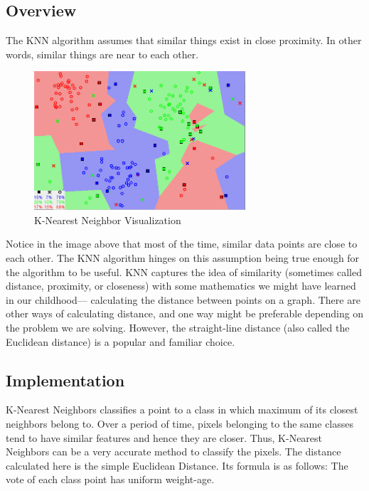 \documentclass[12pt, a4paper]{report}
\begin{document}
\subsection{Overview}
The KNN algorithm assumes that similar things exist in close proximity. In other words, similar things are near to each other.
\begin{figure}[h]
\centering
\includegraphics[width=0.7\textwidth]{knnone.png}
\caption{K-Nearest Neighbor Visualization}
\end{figure}
Notice in the image above that most of the time, similar data points are close to each other. The KNN algorithm hinges on this assumption being true enough for the algorithm to be useful. KNN captures the idea of similarity (sometimes called distance, proximity, or closeness) with some mathematics we might have learned in our childhood— calculating the distance between points on a graph. There are other ways of calculating distance, and one way might be preferable depending on the problem we are solving. However, the straight-line distance (also called the Euclidean distance) is a popular and familiar choice.

\subsection{Implementation}
K-Nearest Neighbors  classifies a point to a class in which maximum of its closest neighbors belong to. Over a period of time, pixels belonging to the same classes tend to have similar features and hence they are closer. Thus, K-Nearest Neighbors can be a very accurate method to classify the pixels. The distance calculated here is the simple Euclidean Distance. Its formula is as follows:
The vote of each class point has uniform weight-age.
\end{document}
